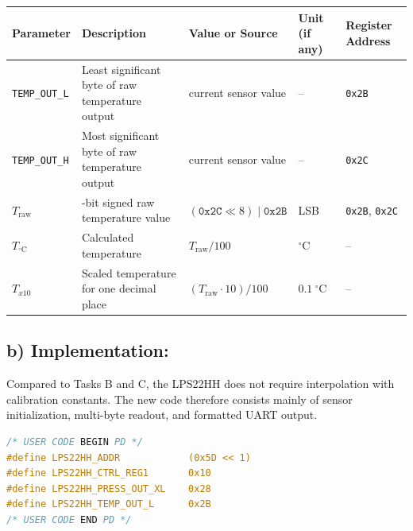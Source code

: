 \begin{table}[H]
	\centering
	\begin{tabularx}{\textwidth}{|>{\raggedright\arraybackslash}p{2.8cm}|>{\raggedright\arraybackslash}X|>{\raggedright\arraybackslash}p{2.8cm}|>{\raggedright\arraybackslash}p{2cm}|>{\raggedright\arraybackslash}p{3cm}|}
		\hline
		\textbf{Parameter}       & \textbf{Description}                                       & \textbf{Value or Source}                    & \textbf{Unit (if any)}   & \textbf{Register Address}    \\ \hline
		\texttt{TEMP\_OUT\_L}    & Least significant byte of raw temperature output           & current sensor value                        & --                       & \texttt{0x2B}                \\ \hline
		\texttt{TEMP\_OUT\_H}    & Most significant byte of raw temperature output            & current sensor value                        & --                       & \texttt{0x2C}                \\ \hline
		\(T_{\mathrm{raw}}\)     & 16-bit signed raw temperature value                        & \((\texttt{0x2C} \ll 8)\;|\;\texttt{0x2B}\) & LSB                      & \texttt{0x2B}, \texttt{0x2C} \\ \hline
		\(T_{^\circ\mathrm{C}}\) & Calculated temperature                                     & \(T_{\mathrm{raw}} / 100\)                  & \(^\circ\mathrm{C}\)     & --                           \\ \hline
		\(T_{x10}\)              & Scaled temperature for one decimal place                   & \((T_{\mathrm{raw}} \cdot 10)/100\)         & \(0.1~^\circ\mathrm{C}\) & --                           \\ \hline
	\end{tabularx}
\end{table}

\subsection{b) Implementation:}

Compared to Tasks B and C, the LPS22HH does not require interpolation with calibration constants. The new code therefore consists mainly of sensor initialization, multi-byte readout, and formatted UART output.

\begin{lstlisting}[language=C,caption={LPS22HH register definitions}]
/* USER CODE BEGIN PD */
#define LPS22HH_ADDR            (0x5D << 1)
#define LPS22HH_CTRL_REG1       0x10
#define LPS22HH_PRESS_OUT_XL    0x28
#define LPS22HH_TEMP_OUT_L      0x2B
/* USER CODE END PD */
\end{lstlisting}

